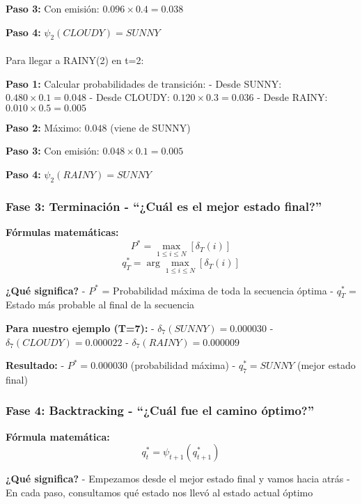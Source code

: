 \documentclass[
]{article}
\makeatletter
\let\oldparagraph\paragraph
\renewcommand{\paragraph}{
    \@ifstar
      \xxxParagraphStar
      \xxxParagraphNoStar
  }
\newcommand{\xxxParagraphStar}[1]{\oldparagraph*{#1}\mbox{}}
\newcommand{\xxxParagraphNoStar}[1]{\oldparagraph{#1}\mbox{}}
\makeatother
\begin{document}
\textbf{Paso 3:} Con emisión: \(0.096 \times 0.4 = 0.038\)

\textbf{Paso 4:} \(\psi_2(CLOUDY) = SUNNY\)

\paragraph{Para llegar a RAINY(2) en
t=2:}\label{para-llegar-a-rainy2-en-t2}

\textbf{Paso 1:} Calcular probabilidades de transición: - Desde SUNNY:
\(0.480 \times 0.1 = 0.048\) - Desde CLOUDY:
\(0.120 \times 0.3 = 0.036\) - Desde RAINY: \(0.010 \times 0.5 = 0.005\)

\textbf{Paso 2:} Máximo: \(0.048\) (viene de SUNNY)

\textbf{Paso 3:} Con emisión: \(0.048 \times 0.1 = 0.005\)

\textbf{Paso 4:} \(\psi_2(RAINY) = SUNNY\)

\subsubsection{Fase 3: Terminación - ``¿Cuál es el mejor estado
final?''}\label{fase-3-terminaciuxf3n---cuuxe1l-es-el-mejor-estado-final}

\textbf{Fórmulas matemáticas:}
\[P^* = \max_{1 \leq i \leq N} [\delta_T(i)]\]
\[q_T^* = \arg\max_{1 \leq i \leq N} [\delta_T(i)]\]

\textbf{¿Qué significa?} - \(P^*\) = Probabilidad máxima de toda la
secuencia óptima - \(q_T^*\) = Estado más probable al final de la
secuencia

\textbf{Para nuestro ejemplo (T=7):} - \(\delta_7(SUNNY) = 0.000030\) -
\(\delta_7(CLOUDY) = 0.000022\) - \(\delta_7(RAINY) = 0.000009\)

\textbf{Resultado:} - \(P^* = 0.000030\) (probabilidad máxima) -
\(q_7^* = SUNNY\) (mejor estado final)

\subsubsection{Fase 4: Backtracking - ``¿Cuál fue el camino
óptimo?''}\label{fase-4-backtracking---cuuxe1l-fue-el-camino-uxf3ptimo}

\textbf{Fórmula matemática:} \[q_t^* = \psi_{t+1}(q_{t+1}^*)\]

\textbf{¿Qué significa?} - Empezamos desde el mejor estado final y vamos
hacia atrás - En cada paso, consultamos qué estado nos llevó al estado
actual óptimo
\end{document}
